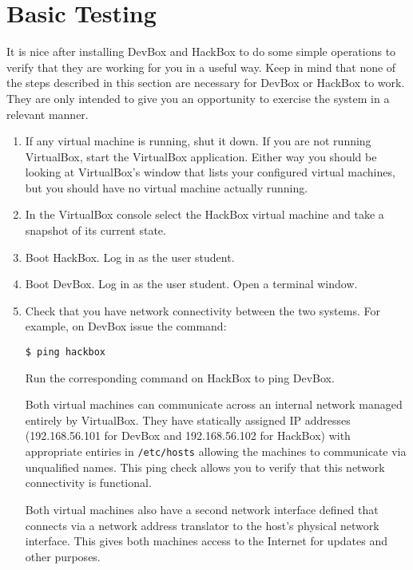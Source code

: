 \documentclass[twocolumn]{article}
\begin{document}
\section{Basic Testing}

It is nice after installing DevBox and HackBox to do some simple operations to verify that they
are working for you in a useful way. Keep in mind that none of the steps described in this
section are necessary for DevBox or HackBox to work. They are only intended to give you an
opportunity to exercise the system in a relevant manner.

\begin{enumerate}

\item If any virtual machine is running, shut it down. If you are not running VirtualBox, start
  the VirtualBox application. Either way you should be looking at VirtualBox's window that lists
  your configured virtual machines, but you should have no virtual machine actually running.

\item In the VirtualBox console select the HackBox virtual machine and take a snapshot of its
  current state.

\item Boot HackBox. Log in as the user student.

\item Boot DevBox. Log in as the user student. Open a terminal window.

\item Check that you have network connectivity between the two systems. For example, on DevBox
  issue the command:
\begin{Verbatim}
$ ping hackbox
\end{Verbatim}
  Run the corresponding command on HackBox to ping DevBox.

  Both virtual machines can communicate across an internal network managed entirely by
  VirtualBox. They have statically assigned IP addresses (192.168.56.101 for DevBox and
  192.168.56.102 for HackBox) with appropriate entiries in \texttt{/etc/hosts} allowing the
  machines to communicate via unqualified names. This ping check allows you to verify that this
  network connectivity is functional.

  Both virtual machines also have a second network interface defined that connects via a network
  address translator to the host's physical network interface. This gives both machines access
  to the Internet for updates and other purposes.


\end{enumerate}
\end{document}
